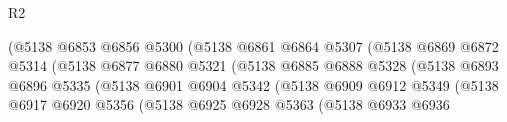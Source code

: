 \begin{lexlean}{R2}
\begin{coremodule}
                                            (@5138
                                              @6853
                                              @6856
                                              @5300
                                              (@5138
                                                @6861
                                                @6864
                                                @5307
                                                (@5138
                                                  @6869
                                                  @6872
                                                  @5314
                                                  (@5138
                                                    @6877
                                                    @6880
                                                    @5321
                                                    (@5138
                                                      @6885
                                                      @6888
                                                      @5328
                                                      (@5138
                                                        @6893
                                                        @6896
                                                        @5335
                                                        (@5138
                                                          @6901
                                                          @6904
                                                          @5342
                                                          (@5138
                                                            @6909
                                                            @6912
                                                            @5349
                                                            (@5138
                                                              @6917
                                                              @6920
                                                              @5356
                                                              (@5138
                                                                @6925
                                                                @6928
                                                                @5363
                                                                (@5138
                                                                  @6933
                                                                  @6936

\end{coremodule}
\end{lexlean}
